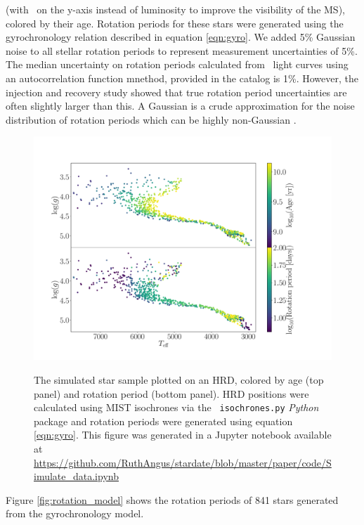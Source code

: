 (with \logg\ on the y-axis instead of luminosity to improve the visibility of
the MS), colored by their age.
Rotation periods for these stars were generated using the gyrochronology
relation described in equation \ref{eqn:gyro}.
We added 5\% Gaussian noise to all stellar rotation periods to represent
measurement uncertainties of 5\%.
The median uncertainty on rotation periods calculated from \kepler\ light
curves using an autocorrelation function mnethod, provided in the
\citet{mcquillan2014} catalog is 1\%.
However, the \citet{aigrain2015} injection and recovery study showed that true
rotation period uncertainties are often slightly larger than this.
A Gaussian is a crude approximation for the noise distribution of rotation
periods which can be highly non-Gaussian \citep[\eg][]{aigrain2015,
angus2018}.
\begin{figure}
  \caption{
      The simulated star sample plotted on an HRD, colored by age
    (top panel) and rotation period (bottom panel).
    HRD positions were calculated using MIST isochrones via the {\tt
    isochrones.py} {\it Python} package and rotation periods were generated
    using equation \ref{eqn:gyro}.
    This figure was generated in a Jupyter notebook available at
    \url{https://github.com/RuthAngus/stardate/blob/master/paper/code/Simulate_data.ipynb}
}
  \centering
    \includegraphics[width=1\textwidth]{simulated_CMD}
\label{fig:CMD_age}
\end{figure}
Figure \ref{fig:rotation_model} shows the rotation periods of 841
stars generated from the gyrochronology model.
